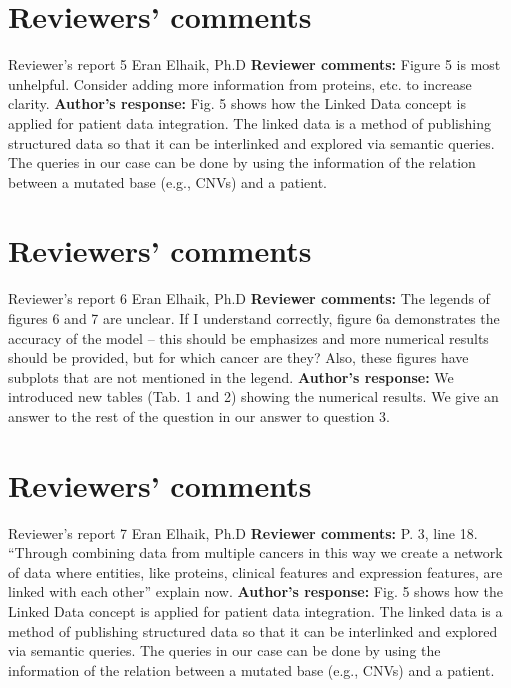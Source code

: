 \documentclass{bmcart}
\begin{document}
\begin{backmatter}
\section*{Reviewers' comments}
\newline Reviewer's report 5
\newline Eran Elhaik, Ph.D
\newline \textbf{Reviewer comments:}
 Figure 5 is most unhelpful. Consider adding more information from proteins, etc. to increase clarity.
\newline \textbf{Author's response:}
Fig. 5 shows how the Linked Data concept is applied for patient data integration. The linked data is a method of publishing structured data so that it can be interlinked and explored via semantic queries. The queries in our case can be done by using the information of the relation between a mutated base (e.g., CNVs) and a patient. 

\section*{Reviewers' comments}
\newline Reviewer's report 6
\newline Eran Elhaik, Ph.D
\newline \textbf{Reviewer comments:}
The legends of figures 6 and 7 are unclear. If I understand correctly, figure 6a demonstrates the accuracy of the model – this should be emphasizes and more numerical results should be provided, but for which cancer are they? Also, these figures have subplots that are not mentioned in the legend.
\newline \textbf{Author's response:}
We introduced new tables (Tab. 1 and 2) showing the numerical results. We give an answer to the rest of the question in our answer to question 3.

\section*{Reviewers' comments}
\newline Reviewer's report 7
\newline Eran Elhaik, Ph.D
\newline \textbf{Reviewer comments:}
P. 3, line 18. “Through combining data from multiple cancers in this way we create a network of data where entities, like proteins, clinical features and expression features, are linked with each other” explain now.
\newline \textbf{Author's response:}
Fig. 5 shows how the Linked Data concept is applied for patient data integration. The linked data is a method of publishing structured data so that it can be interlinked and explored via semantic queries. The queries in our case can be done by using the information of the relation between a mutated base (e.g., CNVs) and a patient.


\end{backmatter}
\end{document}
